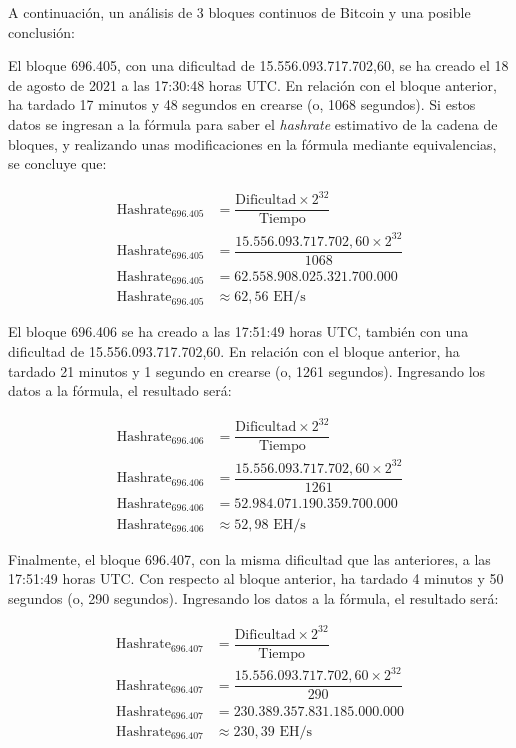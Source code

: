 \documentclass[12pt,a4paper,twoside]{book}
\begin{document}
A continuación, un análisis de 3 bloques continuos de Bitcoin y una posible conclusión:

El bloque 696.405, con una dificultad de 15.556.093.717.702,60, se ha creado el 18 de agosto de 2021 a las 17:30:48 horas UTC. En relación con el bloque anterior, ha tardado 17 minutos y 48 segundos en crearse (o, 1068 segundos). Si estos datos se ingresan a la fórmula para saber el \textit{hashrate} estimativo de la cadena de bloques, y realizando unas modificaciones en la fórmula mediante equivalencias, se concluye que:

\begin{align*}
\text{Hashrate}_{696.405} &= \dfrac{\text{Dificultad} \times 2^{32}}{\text{Tiempo}} \\[2ex]
\text{Hashrate}_{696.405} &= \dfrac{15.556.093.717.702,60 \times 2^{32}}{1068} \\[2ex]
\text{Hashrate}_{696.405} &= 62.558.908.025.321.700.000 \\
\text{Hashrate}_{696.405} & \approx 62,56 \text{ EH/s}
\end{align*}

El bloque 696.406 se ha creado a las 17:51:49 horas UTC, también con una dificultad de 15.556.093.717.702,60. En relación con el bloque anterior, ha tardado 21 minutos y 1 segundo en crearse (o, 1261 segundos). Ingresando los datos a la fórmula, el resultado será:

\begin{align*}
\text{Hashrate}_{696.406} &= \dfrac{\text{Dificultad} \times 2^{32}}{\text{Tiempo}} \\[2ex]
\text{Hashrate}_{696.406} &= \dfrac{15.556.093.717.702,60 \times 2^{32}}{1261} \\[2ex]
\text{Hashrate}_{696.406} &= 52.984.071.190.359.700.000 \\
\text{Hashrate}_{696.406} & \approx 52,98 \text{ EH/s}
\end{align*}

Finalmente, el bloque 696.407, con la misma dificultad que las anteriores, a las 17:51:49 horas UTC. Con respecto al bloque anterior, ha tardado 4 minutos y 50 segundos (o, 290 segundos). Ingresando los datos a la fórmula, el resultado será:

\begin{align*}
\text{Hashrate}_{696.407} &= \dfrac{\text{Dificultad} \times 2^{32}}{\text{Tiempo}} \\[2ex]
\text{Hashrate}_{696.407} &= \dfrac{15.556.093.717.702,60 \times 2^{32}}{290} \\[2ex]
\text{Hashrate}_{696.407} &= 230.389.357.831.185.000.000 \\[2ex]
\text{Hashrate}_{696.407} & \approx 230,39 \text{ EH/s}
\end{align*}
\end{document}
